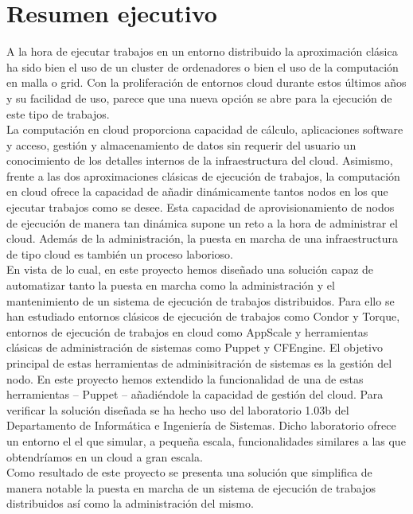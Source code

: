 \chapter{Resumen ejecutivo}
\label{cap:resumen}

{\sf

A la hora de ejecutar trabajos en un entorno distribuido la aproximación clásica ha sido bien el uso de un cluster de ordenadores o bien el uso de la computación en malla o grid. Con la proliferación de entornos cloud durante estos últimos años y su facilidad de uso, parece que una nueva opción se abre para la ejecución de este tipo de trabajos.\\

La computación en cloud proporciona capacidad de cálculo, aplicaciones software y acceso, gestión y almacenamiento de datos sin requerir del usuario un conocimiento de los detalles internos de la infraestructura del cloud. Asimismo, frente a las dos aproximaciones clásicas de ejecución de trabajos, la computación en cloud ofrece la capacidad de añadir dinámicamente tantos nodos en los que ejecutar trabajos como se desee. Esta capacidad de aprovisionamiento de nodos de ejecución de manera tan dinámica supone un reto a la hora de administrar el cloud. Además de la administración, la puesta en marcha de una infraestructura de tipo cloud es también un proceso laborioso.\\

En vista de lo cual, en este proyecto hemos diseñado una solución capaz de automatizar tanto la puesta en marcha como la administración y el mantenimiento de un sistema de ejecución de trabajos distribuidos. Para ello se han estudiado entornos clásicos de ejecución de trabajos como Condor y Torque, entornos de ejecución de trabajos en cloud como AppScale y herramientas clásicas de administración de sistemas como Puppet y CFEngine. El objetivo principal de estas herramientas de adminisitración de sistemas es la gestión del nodo. En este proyecto hemos extendido la funcionalidad de una de estas herramientas -- Puppet -- añadiéndole la capacidad de gestión del cloud. Para verificar la solución diseñada se ha hecho uso del laboratorio 1.03b del Departamento de Informática e Ingeniería de Sistemas. Dicho laboratorio ofrece un entorno el el que simular, a pequeña escala, funcionalidades similares a las que obtendríamos en un cloud a gran escala.\\

Como resultado de este proyecto se presenta una solución que simplifica de manera notable la puesta en marcha de un sistema de ejecución de trabajos distribuidos así como la administración del mismo.
}
